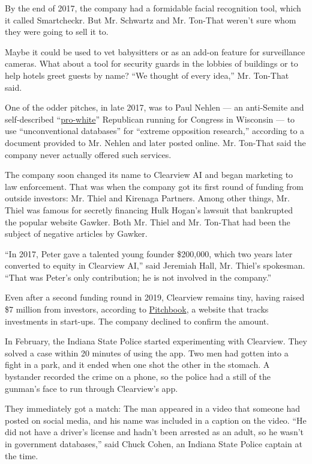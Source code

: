 By the end of 2017, the company had a formidable facial recognition
tool, which it called Smartcheckr. But Mr. Schwartz and Mr. Ton-That
weren't sure whom they were going to sell it to.

Maybe it could be used to vet babysitters or as an add-on feature for
surveillance cameras. What about a tool for security guards in the
lobbies of buildings or to help hotels greet guests by name? ``We
thought of every idea,'' Mr. Ton-That said.

One of the odder pitches, in late 2017, was to Paul Nehlen --- an
anti-Semite and self-described
``\href{https://www.washingtonpost.com/news/powerpost/wp/2017/12/27/ryans-pro-white-primary-foe-denounced-by-breitbart-after-his-anti-semitic-tweets/}{pro-white}''
Republican running for Congress in Wisconsin --- to use ``unconventional
databases'' for ``extreme opposition research,'' according to a document
provided to Mr. Nehlen and later posted online. Mr. Ton-That said the
company never actually offered such services.

The company soon changed its name to Clearview AI and began marketing to
law enforcement. That was when the company got its first round of
funding from outside investors: Mr. Thiel and Kirenaga Partners. Among
other things, Mr. Thiel was famous for secretly financing Hulk Hogan's
lawsuit that bankrupted the popular website Gawker. Both Mr. Thiel and
Mr. Ton-That had been the subject of negative articles by Gawker.

``In 2017, Peter gave a talented young founder \$200,000, which two
years later converted to equity in Clearview AI,'' said Jeremiah Hall,
Mr. Thiel's spokesman. ``That was Peter's only contribution; he is not
involved in the company.''

Even after a second funding round in 2019, Clearview remains tiny,
having raised \$7 million from investors, according to
\href{https://pitchbook.com/profiles/company/232177-96}{Pitchbook}, a
website that tracks investments in start-ups. The company declined to
confirm the amount.

In February, the Indiana State Police started experimenting with
Clearview. They solved a case within 20 minutes of using the app. Two
men had gotten into a fight in a park, and it ended when one shot the
other in the stomach. A bystander recorded the crime on a phone, so the
police had a still of the gunman's face to run through Clearview's app.

They immediately got a match: The man appeared in a video that someone
had posted on social media, and his name was included in a caption on
the video. ``He did not have a driver's license and hadn't been arrested
as an adult, so he wasn't in government databases,'' said Chuck Cohen,
an Indiana State Police captain at the time.

